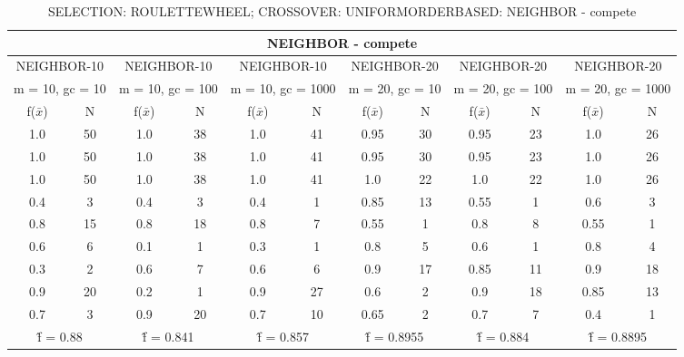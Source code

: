 \begin{table}[H]
	\centering
	\caption{SELECTION: ROULETTEWHEEL; CROSSOVER: UNIFORMORDERBASED: NEIGHBOR - compete}
	\begin{adjustbox}{width=1\textwidth}
		\begin{tabular}{ |c|c||c|c||c|c||c|c||c|c||c|c| }
			\hline
			\multicolumn{12}{|c|}{NEIGHBOR - compete} \\
			\hline
			\multicolumn{2}{|c||}{NEIGHBOR-10} & \multicolumn{2}{c||}{NEIGHBOR-10} & \multicolumn{2}{c||}{NEIGHBOR-10} & \multicolumn{2}{c||}{NEIGHBOR-20} & \multicolumn{2}{c||}{NEIGHBOR-20} & \multicolumn{2}{c|}{NEIGHBOR-20}\\
			\hline
			\multicolumn{2}{|c||}{m = 10, gc = 10} & \multicolumn{2}{c||}{m = 10, gc = 100} & \multicolumn{2}{c||}{m = 10, gc = 1000} & \multicolumn{2}{c||}{m = 20, gc = 10} & \multicolumn{2}{c||}{m = 20, gc = 100} & \multicolumn{2}{c|}{m = 20, gc = 1000}\\
			\hline
			f($\bar{x}$) & N & f($\bar{x}$) & N & f($\bar{x}$) & N & f($\bar{x}$) & N & f($\bar{x}$) & N & f($\bar{x}$) & N\\
			\hline
			\hline
			1.0 & 50 & 1.0 & 38 & 1.0 & 41 & 0.95 & 30 & 0.95 & 23 & 1.0 & 26\\
			\hline
			1.0 & 50 & 1.0 & 38 & 1.0 & 41 & 0.95 & 30 & 0.95 & 23 & 1.0 & 26\\
			1.0 & 50 & 1.0 & 38 & 1.0 & 41 & 1.0 & 22 & 1.0 & 22 & 1.0 & 26\\
			0.4 & 3 & 0.4 & 3 & 0.4 & 1 & 0.85 & 13 & 0.55 & 1 & 0.6 & 3\\
			0.8 & 15 & 0.8 & 18 & 0.8 & 7 & 0.55 & 1 & 0.8 & 8 & 0.55 & 1\\
			0.6 & 6 & 0.1 & 1 & 0.3 & 1 & 0.8 & 5 & 0.6 & 1 & 0.8 & 4\\
			0.3 & 2 & 0.6 & 7 & 0.6 & 6 & 0.9 & 17 & 0.85 & 11 & 0.9 & 18\\
			0.9 & 20 & 0.2 & 1 & 0.9 & 27 & 0.6 & 2 & 0.9 & 18 & 0.85 & 13\\
			0.7 & 3 & 0.9 & 20 & 0.7 & 10 & 0.65 & 2 & 0.7 & 7 & 0.4 & 1\\
			\hline
			\multicolumn{2}{|c||}{\^{f} = 0.88} & \multicolumn{2}{c||}{\^{f} = 0.841} & \multicolumn{2}{c||}{\^{f} = 0.857} & \multicolumn{2}{c||}{\^{f} = 0.8955} & \multicolumn{2}{c||}{\^{f} = 0.884} & \multicolumn{2}{c|}{\^{f} = 0.8895}\\
			\hline
		\end{tabular}
	\end{adjustbox}
\end{table}
